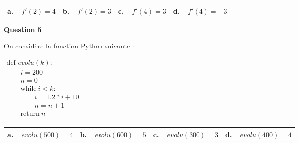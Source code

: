 \documentclass[10pt]{article}
\begin{document}
\begin{center}
\begin{tabularx}{\linewidth}{|*{4}{X|}}\hline
\textbf{a.~~}$f'(2) = 4$& \textbf{b.~~}$f'(2) = 3$&\textbf{c.~~}$f'(4)=3$&\textbf{d.~~}$f'(4)= - 3$ \\ \hline
\end{tabularx}
\end{center}

\medskip

\textbf{Question 5}

\medskip

On considère la fonction Python suivante :

\begin{center}
$\begin{array}{l}
\text{def } evolu(k) :\\
\qquad  i = 200\\
\qquad n = 0\\
\qquad \text{while}\: i < k :\\
\qquad\qquad i= 1.2*i + 10\\
\qquad\qquad n = n+1\\
\qquad \text{return}\: n\\
\end{array}$
\end{center}

\begin{center}
\begin{tabularx}{\linewidth}{|*{4}{X|}}\hline
\textbf{a.~~}$evolu(500) = 4$& \textbf{b.~~}$evolu(600) = 5$&\textbf{c.~~}$evolu(300) = 3$&\textbf{d.~~}$evolu(400) = 4$\\ \hline
\end{tabularx}
\end{center}

\bigskip
\end{document}
